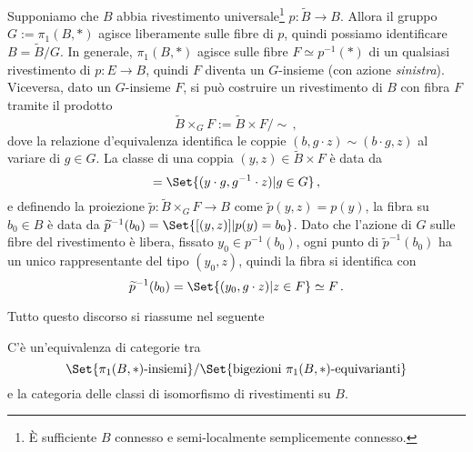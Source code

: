 Supponiamo che $B$ abbia rivestimento universale\footnote{\`{E} sufficiente $B$ connesso e semi-localmente semplicemente connesso.} $p:\widetilde{B} \to B$. 
Allora il gruppo $G:=\pi_{1}(B,\ast)$ agisce liberamente
sulle fibre di $p$, quindi possiamo identificare $B = \widetilde{B}/G$. 
In generale, $\pi_{1}(B,\ast)$ agisce sulle fibre $F \simeq p^{-1}(\ast)$ 
di un qualsiasi rivestimento di $p:E \to B$, 
quindi $F$ diventa un $G$-insieme (con azione \emph{sinistra}).
Viceversa, dato un $G$-insieme $F$, si può costruire un rivestimento di $B$ con
fibra $F$ tramite il prodotto
\begin{equation*}
	\widetilde{B} \times_{G} F := \widetilde{B} \times F / \sim\,,
\end{equation*}
dove la relazione d'equivalenza identifica le coppie
$(b,g \cdot z) \sim (b \cdot g, z)$ al variare di $g \in G$.
La classe di una coppia $(y,z) \in \widetilde{B} \times F$ è data da
\begin{equation*}
	[(y,z)] = \Set{(y \cdot g, g^{-1} \cdot z) | g \in G}\,,
\end{equation*}
e definendo la proiezione $\widetilde{p}:\widetilde{B} \times_{G} F \to B$
come $\widetilde{p}(y,z) = p(y)$, la fibra su $b_{0} \in B$ è data da
$\widetilde{p}^{-1}(b_{0}) = \Set{[(y,z)] | p(y) = b_{0}}$.
Dato che l'azione di $G$ sulle fibre del rivestimento è libera, 
fissato $y_{0} \in p^{-1}(b_{0})$, ogni punto di $\widetilde{p}^{-1}(b_{0})$
ha un unico rappresentante del tipo $(y_{0},z)$, %
quindi la fibra si identifica con
\begin{equation*}
	\widetilde{p}^{-1}(b_{0}) = \Set{(y_{0},g \cdot z) | z \in F} %
	\simeq F\,.
\end{equation*}


%

Tutto questo discorso si riassume nel seguente

\begin{thm}
	C'è un'equivalenza di categorie tra
	\begin{equation*}
		\Set{\pi_{1}(B,\ast)\text{-insiemi}}/ \Set{\text{bigezioni } \pi_{1}(B,\ast)\text{-equivarianti}}
	\end{equation*}
	e la categoria delle classi di isomorfismo di rivestimenti su $B$.
\end{thm}

